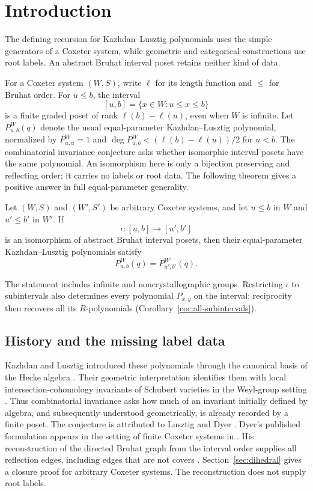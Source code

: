 \section{Introduction}\label{sec:introduction}
The defining recursion for Kazhdan--Lusztig polynomials uses the simple
generators of a Coxeter system, while geometric and categorical
constructions use root labels.  An abstract Bruhat interval poset retains
neither kind of data.

For a Coxeter system $(W,S)$, write $\ell$ for its length function and
$\le$ for Bruhat order. For $u\le b$, the interval
\[
 [u,b]=\{x\in W:u\le x\le b\}
\]
is a finite graded poset of rank $\ell(b)-\ell(u)$, even when $W$ is
infinite. Let $P^W_{u,b}(q)$ denote the usual equal-parameter
Kazhdan--Lusztig polynomial, normalized by $P^W_{u,u}=1$ and
$\deg P^W_{u,b}< (\ell(b)-\ell(u))/2$ for $u<b$.
The combinatorial invariance conjecture asks whether isomorphic interval
posets have the same polynomial. An isomorphism here is only a bijection
preserving and reflecting order; it carries no labels or root data.
The following theorem gives a positive answer in full equal-parameter
generality.

\begin{theorem}\label{thm:main}
Let $(W,S)$ and $(W',S')$ be arbitrary Coxeter systems, and let
$u\le b$ in $W$ and $u'\le b'$ in $W'$.
If
\[
 \iota:[u,b]\longrightarrow[u',b']
\]
is an isomorphism of abstract Bruhat interval posets, then their
equal-parameter Kazhdan--Lusztig polynomials satisfy
\[
 P^W_{u,b}(q)=P^{W'}_{u',b'}(q).
\]
\end{theorem}
The statement includes infinite and noncrystallographic groups.
Restricting $\iota$ to subintervals also determines every
polynomial $P_{x,y}$ on the interval; reciprocity then recovers all its
$R$-polynomials (Corollary~\ref{cor:all-subintervals}).

\subsection{History and the missing label data}
Kazhdan and Lusztig introduced these polynomials through the canonical
basis of the Hecke algebra \cite{KL79}. Their geometric interpretation
identifies them with local intersection-cohomology invariants of Schubert
varieties in the Weyl-group setting \cite{KL80}. Thus combinatorial
invariance asks how much of an invariant initially defined by algebra,
and subsequently understood geometrically, is already recorded by a
finite poset. The conjecture is attributed to Lusztig and Dyer
\cite{Delanoy06}. Dyer's published formulation appears in the setting of
finite Coxeter systems in \cite[Section~3.5]{Dyer91}. His reconstruction
of the directed Bruhat graph from the interval order supplies all reflection
edges, including edges that are not covers
\cite[Proposition~3.3]{Dyer91}. Section~\ref{sec:dihedral} gives a closure
proof for arbitrary Coxeter systems.
The reconstruction does not supply root labels.

